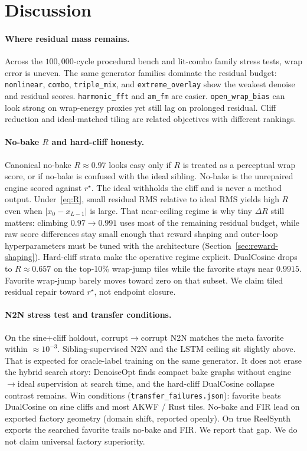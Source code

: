 \section{Discussion}
\label{sec:discussion}

\paragraph{Where residual mass remains.}
Across the $100{,}000$-cycle procedural bench and lit-combo family stress tests, wrap error is uneven.
The same generator families dominate the residual budget: \texttt{nonlinear}, \texttt{combo}, \texttt{triple\_mix}, and \texttt{extreme\_overlay} show the weakest denoise and residual scores.
\texttt{harmonic\_fft} and \texttt{am\_fm} are easier.
\texttt{open\_wrap\_bias} can look strong on wrap-energy proxies yet still lag on prolonged residual.
Cliff reduction and ideal-matched tiling are related objectives with different rankings.

\paragraph{No-bake $R$ and hard-cliff honesty.}
Canonical no-bake $R\approx 0.97$ looks easy only if $R$ is treated as a perceptual wrap score, or if no-bake is confused with the ideal sibling.
No-bake is the unrepaired engine scored against $r^{\star}$.
The ideal withholds the cliff and is never a method output.
Under~\eqref{eq:R}, small residual RMS relative to ideal RMS yields high $R$ even when $|x_0-x_{L-1}|$ is large.
That near-ceiling regime is why tiny $\Delta R$ still matters: climbing $0.97\to 0.991$ uses most of the remaining residual budget, while raw score differences stay small enough that reward shaping and outer-loop hyperparameters must be tuned with the architecture (Section~\ref{sec:reward-shaping}).
Hard-cliff strata make the operative regime explicit.
DualCosine drops to $R\approx 0.657$ on the top-10\% wrap-jump tiles while the favorite stays near $0.9915$.
Favorite wrap-jump barely moves toward zero on that subset.
We claim tiled residual repair toward $r^{\star}$, not endpoint closure.

\paragraph{N2N stress test and transfer conditions.}
On the sine{+}cliff holdout, corrupt$\to$corrupt N2N matches the meta favorite within $\approx 10^{-3}$.
Sibling-supervised N2N and the LSTM ceiling sit slightly above.
That is expected for oracle-label training on the same generator.
It does not erase the hybrid search story: DenoiseOpt finds compact bake graphs without engine$\to$ideal supervision at search time, and the hard-cliff DualCosine collapse contrast remains.
Win conditions (\texttt{transfer\_failures.json}): favorite beats DualCosine on sine cliffs and most AKWF / Rust tiles.
No-bake and FIR lead on exported factory geometry (domain shift, reported openly).
On true ReelSynth exports the searched favorite trails no-bake and FIR.
We report that gap. We do not claim universal factory superiority.

